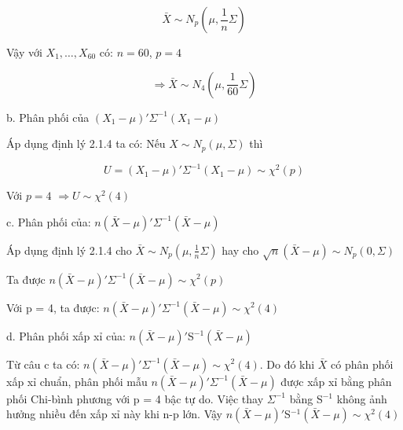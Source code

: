 \documentclass{article}
\begin{document}
\[ \bar{X} \sim N_p (\mu, \frac{1}{n} \Sigma) \]

Vậy với $X_1, \ldots, X_{60}$ có:  $n = 60$, $p = 4$

\[ \Rightarrow \bar{X} \sim N_4(\mu, \frac{1}{60}\Sigma) \]

\vspace{1cm}
b. Phân phối của $(X_1 - \mu)'\Sigma^{-1}(X_1 - \mu)$

Áp dụng định lý 2.1.4 ta có: Nếu $X \sim N_p(\mu, \Sigma)$ thì

\[ U = (X_1 - \mu)'\Sigma^{-1}(X_1 - \mu) \sim \chi^2(p) \]

Với $p = 4$ $\Rightarrow U \sim \chi^2(4)$
\vspace{1cm}

c. Phân phối của: $n(\bar{X} - \mu)'\Sigma^{-1}(\bar{X} - \mu)$
\vspace{0.5cm}

Áp dụng định lý 2.1.4 cho $\bar{X} \sim N_p (\mu, \frac{1}{n} \Sigma)$  hay cho $\sqrt{n}(\bar{X} - \mu) \sim N_p(0, \Sigma)$
\vspace{0.5cm}

Ta được $n(\bar{X} - \mu)'\Sigma^{-1}(\bar{X} - \mu) \sim \chi^2(p)$
\vspace{0.5cm}

Với p = 4, ta được: $ n(\bar{X} - \mu)'\Sigma^{-1}(\bar{X} - \mu) \sim \chi^2(4)$


\vspace{1cm}

d. Phân phối xấp xỉ của: $n(\bar{X} - \mu)'$S$^{-1}(\bar{X} - \mu)$
\vspace{0.5cm}

Từ câu c ta có: $ n(\bar{X} - \mu)'\Sigma^{-1}(\bar{X} - \mu) \sim \chi^2(4)$. Do đó khi $\bar{X}$ có phân phối xấp xỉ chuẩn, phân phối mẫu $ n(\bar{X} - \mu)'\Sigma^{-1}(\bar{X} - \mu)$ được xấp xỉ bằng phân phối Chi-bình phương với p = 4 bậc tự do. Việc thay $\Sigma^{-1}$ bằng S$^{-1}$ không ảnh hưởng nhiều đến xấp xỉ này khi n-p lớn. 
\vspace{0.5cm}
Vậy $n(\bar{X} - \mu)'$S$^{-1}(\bar{X} - \mu) \sim\chi^2(4)$
\end{document}
